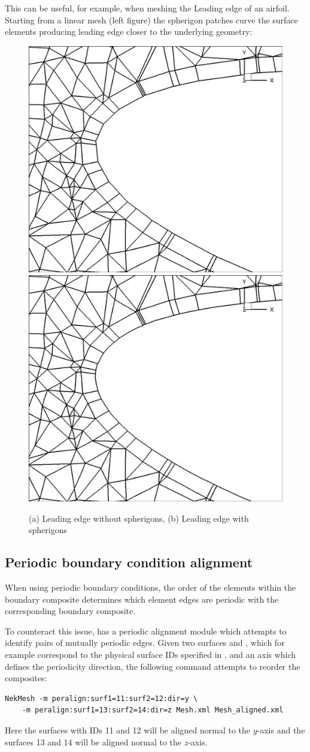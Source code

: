 This can be useful, for example, when meshing the Leading edge of an
airfoil. Starting from a linear mesh (left figure) the spherigon patches curve
the surface elements producing leading edge closer to the underlying geometry:

\begin{figure}[!htbp]
  \begin{center}
    \includegraphics[width = 0.47 \textwidth]{img/noSphnoBL.jpg}
    \includegraphics[width = 0.47 \textwidth]{img/SphnoBL.jpg}
    \caption{(a) Leading edge without spherigons, (b) Leading edge with
      spherigons}
  \end{center}
\end{figure}

\subsection{Periodic boundary condition alignment}

When using periodic boundary conditions, the order of the elements within the
boundary composite determines which element edges are periodic with the
corresponding boundary composite.

To counteract this issue, \mc has a periodic alignment module which attempts to
identify pairs of mutually periodic edges. Given two surfaces  and
, which for example correspond to the physical surface IDs
specified in \gmsh, and an axis which defines the periodicity direction, the
following command attempts to reorder the composites:
%
\begin{lstlisting}[style=BashInputStyle]
NekMesh -m peralign:surf1=11:surf2=12:dir=y \
    -m peralign:surf1=13:surf2=14:dir=z Mesh.xml Mesh_aligned.xml
\end{lstlisting}
%
Here the surfaces with IDs 11 and 12 will be aligned normal to the $y$-axis and
the surfaces 13 and 14 will be aligned normal to the $z$-axis.

